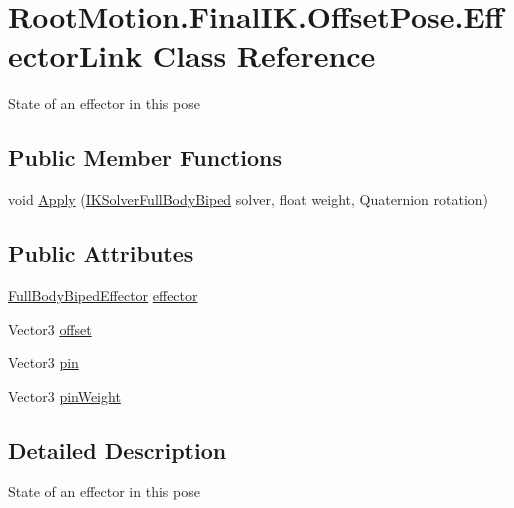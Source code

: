 \hypertarget{class_root_motion_1_1_final_i_k_1_1_offset_pose_1_1_effector_link}{}\section{Root\+Motion.\+Final\+I\+K.\+Offset\+Pose.\+Effector\+Link Class Reference}
\label{class_root_motion_1_1_final_i_k_1_1_offset_pose_1_1_effector_link}


State of an effector in this pose  


\subsection*{Public Member Functions}
\begin{DoxyCompactItemize}
\item 
void \mbox{\hyperlink{class_root_motion_1_1_final_i_k_1_1_offset_pose_1_1_effector_link_a3b6bb8e3962d96601b106af0e2e3b4d2}{Apply}} (\mbox{\hyperlink{class_root_motion_1_1_final_i_k_1_1_i_k_solver_full_body_biped}{I\+K\+Solver\+Full\+Body\+Biped}} solver, float weight, Quaternion rotation)
\end{DoxyCompactItemize}
\subsection*{Public Attributes}
\begin{DoxyCompactItemize}
\item 
\mbox{\hyperlink{namespace_root_motion_1_1_final_i_k_ae0dd2058c7667b6f132c11a6b860c14a}{Full\+Body\+Biped\+Effector}} \mbox{\hyperlink{class_root_motion_1_1_final_i_k_1_1_offset_pose_1_1_effector_link_a1411597a07ad8fbaeee219083c6f8581}{effector}}
\item 
Vector3 \mbox{\hyperlink{class_root_motion_1_1_final_i_k_1_1_offset_pose_1_1_effector_link_a9de8ef3c567ab5f7532dddcf7440af8d}{offset}}
\item 
Vector3 \mbox{\hyperlink{class_root_motion_1_1_final_i_k_1_1_offset_pose_1_1_effector_link_a125b9fd9b544f7bd841755bc5be7e1be}{pin}}
\item 
Vector3 \mbox{\hyperlink{class_root_motion_1_1_final_i_k_1_1_offset_pose_1_1_effector_link_a349fac619206531a83a9e51393da3b6c}{pin\+Weight}}
\end{DoxyCompactItemize}


\subsection{Detailed Description}
State of an effector in this pose 



